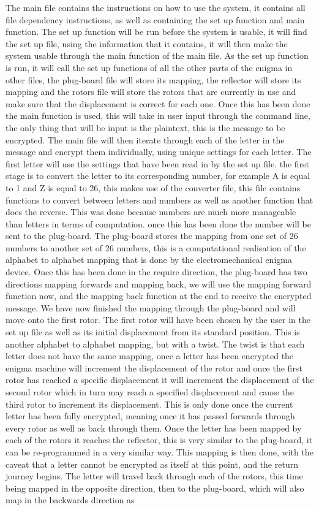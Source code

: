\documentclass[12pt,a4paper]{article}
\begin{document}
The main file contains the instructions on how to use the system, it contains all file dependency instructions, as well as containing the set up function and main function. The set up function will be run before the system is usable, it will find the set up file, using the information that it contains, it will then make the system usable through the main function of the main file. As the set up function is run, it will call the set up functions of all the other parts of the enigma in other files, the plug-board file will store its mapping, the reflector will store its mapping and the rotors file will store the rotors that are currently in use and make sure that the displacement is correct for each one. Once this has been done the main function is used, this will take in user input through the command line, the only thing that will be input is the plaintext, this is the message to be encrypted. The main file will then iterate through each of the letter in the message and encrypt them individually, using unique settings for each letter. The first letter will use the settings that have been read in by the set up file. the first stage is to convert the letter to its corresponding number, for example A is equal to 1 and Z is equal to 26, this makes use of the converter file, this file contains functions to convert between letters and numbers as well as another function that does the reverse. This was done because numbers are much more manageable than letters in terms of computation. once this has been done the number will be sent to the plug-board. The plug-board stores the mapping from one set of 26 numbers to another set of 26 numbers, this is a computational realisation of the alphabet to alphabet mapping that is done by the electromechanical enigma device. Once this has been done in the require direction, the plug-board has two directions mapping forwards and mapping back, we will use the mapping forward function now, and the mapping back function at the end to receive the encrypted message. We have now finished the mapping through the plug-board and will move onto the first rotor. The first rotor will have been chosen by the user in the set up file as well as its initial displacement from its standard position. This is another alphabet to alphabet mapping, but with a twist. The twist is that each letter does not have the same mapping, once a letter has been encrypted the enigma machine will increment the displacement of the rotor and once the first rotor has reached a specific displacement it will increment the displacement of the second rotor which in turn may reach a specified displacement and cause the third rotor to increment its displacement. This is only done once the current letter has been fully encrypted, meaning once it has passed forwards through every rotor as well as back through them. Once the letter has been mapped by each of the rotors it reaches the reflector, this is very similar to the plug-board, it can be re-programmed in a very similar way. This mapping is then done, with the caveat that a letter cannot be encrypted as itself at this point, and the return journey begins. The letter will travel back through each of the rotors, this time being mapped in the opposite direction, then to the plug-board, which will also map in the backwards direction as 
\end{document}
